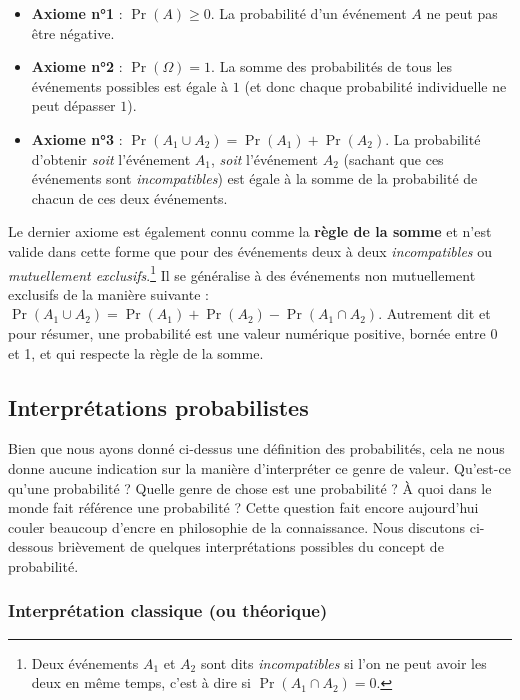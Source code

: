 \documentclass[
  a4paper,11pt,twoside,onecolumn,openright,final,oldfontcommands]{memoir}
\theoremstyle{definition}
\theoremstyle{definition}
\theoremstyle{definition}
\theoremstyle{definition}
\theoremstyle{remark}
\begin{document}
\begin{itemize}
\item
  \textbf{Axiome n°1} : \(\Pr(A) \geq 0\). La probabilité d'un événement \(A\) ne peut pas être négative.
\item
  \textbf{Axiome n°2} : \(\Pr(\Omega) = 1\). La somme des probabilités de tous les événements possibles est égale à \(1\) (et donc chaque probabilité individuelle ne peut dépasser \(1\)).
\item
  \textbf{Axiome n°3} : \(\Pr(A_{1} \cup A_{2}) = \Pr(A_{1}) + \Pr(A_{2})\). La probabilité d'obtenir \emph{soit} l'événement \(A_{1}\), \emph{soit} l'événement \(A_{2}\) (sachant que ces événements sont \emph{incompatibles}) est égale à la somme de la probabilité de chacun de ces deux événements.
\end{itemize}

Le dernier axiome est également connu comme la \textbf{règle de la somme} et n'est valide dans cette forme que pour des événements deux à deux \emph{incompatibles} ou \emph{mutuellement exclusifs}.\footnote{Deux événements \(A_{1}\) et \(A_{2}\) sont dits \emph{incompatibles} si l'on ne peut avoir les deux en même temps, c'est à dire si \(\Pr(A_{1} \cap A_{2}) = 0\).} Il se généralise à des événements non mutuellement exclusifs de la manière suivante : \(\Pr(A_{1} \cup A_{2}) = \Pr(A_{1}) + \Pr(A_{2}) - \Pr(A_{1} \cap A_{2})\). Autrement dit et pour résumer, une probabilité est une valeur numérique positive, bornée entre 0 et 1, et qui respecte la règle de la somme.

\hypertarget{interpruxe9tations-probabilistes}{%
\subsection{Interprétations probabilistes}\label{interpruxe9tations-probabilistes}}

Bien que nous ayons donné ci-dessus une définition des probabilités, cela ne nous donne aucune indication sur la manière d'interpréter ce genre de valeur. Qu'est-ce qu'une probabilité ? Quelle genre de chose est une probabilité ? À quoi dans le monde fait référence une probabilité ? Cette question fait encore aujourd'hui couler beaucoup d'encre en philosophie de la connaissance. Nous discutons ci-dessous brièvement de quelques interprétations possibles du concept de probabilité.

\hypertarget{interpruxe9tation-classique-ou-thuxe9orique}{%
\subsubsection{Interprétation classique (ou théorique)}\label{interpruxe9tation-classique-ou-thuxe9orique}}
\end{document}
